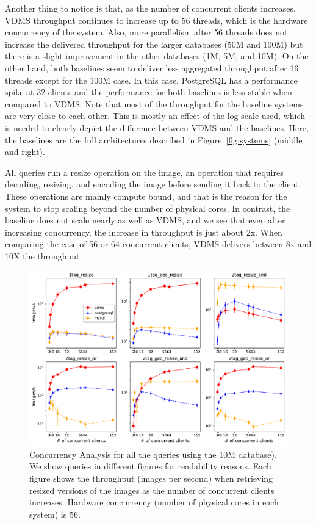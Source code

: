 Another thing to notice is that, as the number of concurrent clients increases,
VDMS throughput continues to increase up to 56 threads, which is
the hardware concurrency of the system.
Also, more parallelism after 56 threads does not increase the delivered throughput
for the larger databases (50M and 100M) but there is a slight improvement in the
other databases (1M, 5M, and 10M).
On the other hand, both baselines seem to deliver less aggregated
throughput after 16 threads except for the 100M case.
In this case, PostgreSQL has a performance spike at 32 clients
and the performance for both baselines is less stable when compared
to VDMS.
Note that most of the throughput for the baseline systems are very close to each other.
This is mostly an effect of the log-scale used, which is needed to clearly
depict the difference between VDMS and the baselines.
Here, the baselines are the full architectures described in
Figure~\ref{fig:systems} (middle and right).

All queries run a resize operation on the image,
an operation that requires decoding, resizing, and encoding the image
before sending it back to the client.
These operations are mainly compute bound, and that is the reason for
the system to stop scaling beyond the number of physical cores.
In contrast, the baseline does not scale nearly as well as VDMS,
and we see that even after increasing concurrency, the increase
in throughput is just about 2x.
When comparing the case of 56 or 64 concurrent clients,
VDMS delivers between 8x and 10X the throughput.

\begin{figure}[ht]
\includegraphics[width=\columnwidth]{figures/plot_conc_dbsize_10M_mosaic_results_throughput}
\caption{Concurrency Analysis for all the queries using the 10M database).
We show queries in different figures for readability reasons.
Each figure shows the throughput (images per second) when retrieving
resized versions of the images as the number of concurrent clients increases.
Hardware concurrency (number of physical cores in each system)
is 56.}
\label{fig:concurrency_comparison_10M}
\end{figure}

